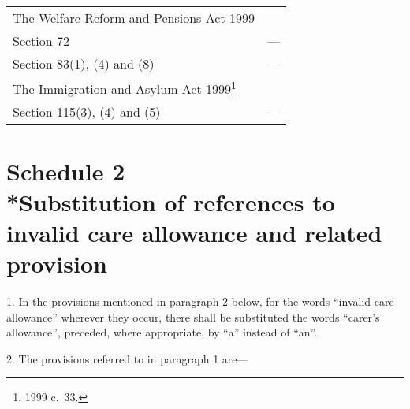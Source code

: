 \documentclass[12pt,a4paper]{article}
\begin{document}
{\begin{longtable}{p{97.9536pt}p{268.04297pt}}
The Welfare Reform and Pensions Act 1999	\\
\hspace{1em}Section 72	&—\\
\hspace{1em}Section 83(1), (4) \hspace*{1em}and (8)	&—\\
The Immigration and Asylum Act 1999\footnote{1999 c.\ 33.}	\\
\hspace{1em}Section 115(3), (4) \hspace*{1em}and (5)	&—\\
\end{longtable}

}

\part[Schedule 2 --- Substitution of references to invalid care allowance and related provision]{Schedule 2\\*Substitution of references to invalid care allowance and related provision}

1.  In the provisions mentioned in paragraph 2 below, for the words “invalid care allowance” wherever they occur, there shall be substituted the words “carer’s allowance”, preceded, where appropriate, by “a” instead of “an”.

\medskip

2.  The provisions referred to in paragraph 1 are—
\end{document}
